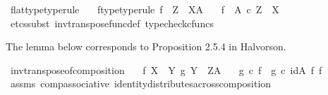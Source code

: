 \begin{isabellebody}
\isanewline
{}\isamarkupfalse%
\ flat{\isacharunderscore}{\kern0pt}type{\isacharbrackleft}{\kern0pt}type{\isacharunderscore}{\kern0pt}rule{\isacharbrackright}{\kern0pt}{\isacharcolon}{\kern0pt}\isanewline
\ \ \ f{\isacharunderscore}{\kern0pt}type{\isacharbrackleft}{\kern0pt}type{\isacharunderscore}{\kern0pt}rule{\isacharbrackright}{\kern0pt}{\isacharcolon}{\kern0pt}\ {\isachardoublequoteopen}f\ {\isacharcolon}{\kern0pt}\ Z\ {\isasymrightarrow}\ X\isactrlbsup A\isactrlesup {\isachardoublequoteclose}\isanewline
\ \ \ {\isachardoublequoteopen}f\isactrlsup {\isasymflat}\ {\isacharcolon}{\kern0pt}\ A\ {\isasymtimes}\isactrlsub c\ Z\ {\isasymrightarrow}\ X{\isachardoublequoteclose}\isanewline
%
\isadelimproof
\ \ %
\endisadelimproof
%
\isatagproof
{}\isamarkupfalse%
\ {\isacharparenleft}{\kern0pt}etcs{\isacharunderscore}{\kern0pt}subst\ inv{\isacharunderscore}{\kern0pt}transpose{\isacharunderscore}{\kern0pt}func{\isacharunderscore}{\kern0pt}def{}{\isacharcomma}{\kern0pt}\ typecheck{\isacharunderscore}{\kern0pt}cfuncs{\isacharparenright}{\kern0pt}%
\endisatagproof
{\isafoldproof}%
%
\isadelimproof
%
\endisadelimproof
%
\begin{isamarkuptext}%
The lemma below corresponds to Proposition 2.5.4 in Halvorson.%
\end{isamarkuptext}\isamarkuptrue%
\isamarkupfalse%
\ inv{\isacharunderscore}{\kern0pt}transpose{\isacharunderscore}{\kern0pt}of{\isacharunderscore}{\kern0pt}composition{\isacharcolon}{\kern0pt}\isanewline
\ \ \ {\isachardoublequoteopen}f{\isacharcolon}{\kern0pt}\ X\ {\isasymrightarrow}\ Y{\isachardoublequoteclose}\ {\isachardoublequoteopen}g{\isacharcolon}{\kern0pt}\ Y\ {\isasymrightarrow}\ Z\isactrlbsup A\isactrlesup {\isachardoublequoteclose}\isanewline
\ \ \ {\isachardoublequoteopen}{\isacharparenleft}{\kern0pt}g\ {\isasymcirc}\isactrlsub c\ f{\isacharparenright}{\kern0pt}\isactrlsup {\isasymflat}\ {\isacharequal}{\kern0pt}\ g\isactrlsup {\isasymflat}\ {\isasymcirc}\isactrlsub c\ {\isacharparenleft}{\kern0pt}id{\isacharparenleft}{\kern0pt}A{\isacharparenright}{\kern0pt}\ {\isasymtimes}\isactrlsub f\ f{\isacharparenright}{\kern0pt}{\isachardoublequoteclose}\isanewline
%
\isadelimproof
\ \ %
\endisadelimproof
%
\isatagproof
{}\isamarkupfalse%
\ assms\ comp{\isacharunderscore}{\kern0pt}associative{}\ identity{\isacharunderscore}{\kern0pt}distributes{\isacharunderscore}{\kern0pt}across{\isacharunderscore}{\kern0pt}composition\isanewline

\end{isabellebody}
